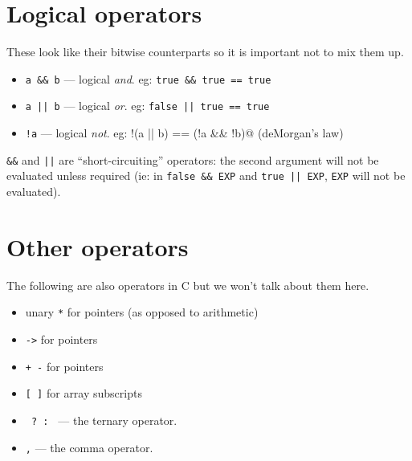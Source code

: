\section{Logical operators}
These look like their bitwise counterparts so it is important not to mix them up.
\begin{itemize}
 \item \lstinline!a && b! --- logical \emph{and}. eg: \lstinline!true && true == true!
 \item \lstinline!a || b! --- logical \emph{or}. eg: \lstinline!false || true == true!
 \item \lstinline|!a|   --- logical \emph{not}. eg: \lstinline@!(a || b) == (!a && !b)@  (deMorgan's law)
\end{itemize}

\lstinline!&&! and \lstinline!||! are ``short-circuiting'' operators: the second argument will not be evaluated unless required (ie: in \lstinline!false && EXP! and \lstinline!true || EXP!, \texttt{EXP} will not be evaluated).

\section{Other operators}

The following are also operators in C but we won't talk about them here.

\begin{itemize}
 \item unary \texttt{*} for pointers (as opposed to arithmetic)
 \item \texttt{->} for pointers
 \item \texttt{+ -} for pointers
 \item \texttt{[ ]} for array subscripts
 \item \texttt{ ? : } --- the ternary operator.
 \item \texttt{,} --- the comma operator.
\end{itemize}
